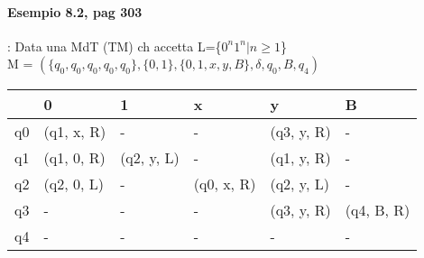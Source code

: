 \documentclass[12pt, a4paper, openany, oneside]{book}
\begin{document}
\paragraph{Esempio 8.2, pag 303}: Data una MdT (TM) ch accetta L=\{$0^{n}1^{n} | n\geq 1$\}\\
M = $(\{q_{0}, q_{0}, q_{0}, q_{0}, q_{0}\}, \{0, 1\}, \{0, 1, x, y, B\}, 
\delta, q_{0}, B, q_{4})$
\begin{center}
\begin{tabular}{l|l|l|l|l|l|}
\cline{2-6}
                         & 0          & 1          & x          & y          & B          \\ \hline
\multicolumn{1}{|l|}{q0} & (q1, x, R) & -          & -          & (q3, y, R) & -          \\ \hline
\multicolumn{1}{|l|}{q1} & (q1, 0, R) & (q2, y, L) & -          & (q1, y, R) & -          \\ \hline
\multicolumn{1}{|l|}{q2} & (q2, 0, L) & -          & (q0, x, R) & (q2, y, L) & -          \\ \hline
\multicolumn{1}{|l|}{q3} & -          & -          & -          & (q3, y, R) & (q4, B, R) \\ \hline
\multicolumn{1}{|l|}{q4} & -          & -          & -          & -          & -          \\ \hline
\end{tabular}
\end{center}
\end{document}
